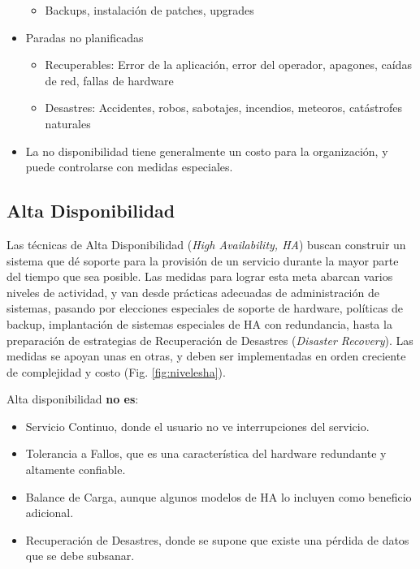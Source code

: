 \begin{itemize}
\begin{itemize}
		\item Backups, instalación de patches, upgrades
	\end{itemize}
	\item Paradas no planificadas
	\begin{itemize}		
		\item Recuperables: Error de la aplicación, error del operador, apagones, caídas de red, fallas de hardware
		\item Desastres: Accidentes, robos, sabotajes, incendios, meteoros, catástrofes naturales
	\end{itemize}
	\item La no disponibilidad tiene generalmente un costo para la organización, y puede controlarse con medidas especiales.
\end{itemize}

\subsection{Alta Disponibilidad}

Las técnicas de Alta Disponibilidad (\textit{High Availability, HA}) buscan construir un sistema que dé soporte para la provisión de un servicio durante la mayor parte del tiempo que sea posible. Las medidas para lograr esta meta abarcan varios niveles de actividad, y van desde prácticas adecuadas de administración de sistemas, pasando por elecciones especiales de soporte de hardware, políticas de backup, implantación de sistemas especiales de HA con redundancia, hasta la preparación de estrategias de Recuperación de Desastres (\textit{Disaster Recovery}). Las medidas se apoyan unas en otras, y deben ser implementadas en orden creciente de complejidad y costo (Fig. \ref{fig:nivelesha}). 


Alta disponibilidad \textbf{no es}:
\begin{itemize}
	\item Servicio Continuo, donde el usuario no ve interrupciones del servicio.
	\item Tolerancia a Fallos, que es una característica del hardware redundante y altamente confiable.
	\item Balance de Carga, aunque algunos modelos de HA lo incluyen como beneficio adicional.
	\item Recuperación de Desastres, donde se supone que existe una pérdida de datos que se debe subsanar.
\end{itemize}

